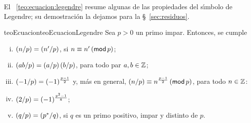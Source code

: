 El \teoname~\ref{teo:ecuacion:legendre} resume algunas de las propiedades del
s\'{\i}mbolo de Legendre; su demostraci\'on la dejamos para la
\S~\ref{sec:residuos}.

\begin{restatable}{teoEcuacion}{teoEcuacionLegendre}%
	\label{teo:ecuacion:legendre}
	Sea $p>0$ un primo impar. Entonces, se cumple
	\begin{enumerate}[(i)]
		\item\label{item:ecuacion:legendre:clases}
			$\tlegendre n{p}=\tlegendre{n'} p$,
			si $n\equiv n'\tmodulo[p]$;
		\item\label{item:ecuacion:legendre:multiplicativo}
			$\tlegendre{ab} p=\tlegendre a{p}\tlegendre b{p}$,
			para todo par $a,b\in\Enteros$;
		\item\label{item:ecuacion:legendre:menos-uno}
			$\tlegendre{-1} p=(-1)^{\frac{p-1} 2}$ y,
			m\'as en general,
			$\tlegendre n{p}\equiv n^{\frac{p-1} 2}\tmodulo[p]$,
			para todo $n\in\Enteros$:
		\item\label{item:ecuacion:legendre:dos}
			$\tlegendre 2{p}=(-1)^{\frac{p^2-1} 8}$;
		\item\label{item:ecuacion:legendre:reciprocidad}
			$\tlegendre q{p}=\tlegendre{p^*} q$,
			si $q$ es un primo positivo, impar y distinto de $p$.
	\end{enumerate}
\end{restatable}

